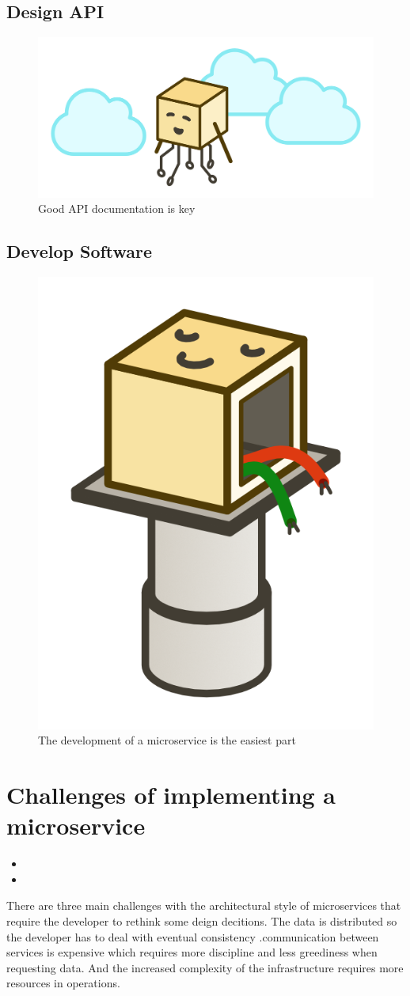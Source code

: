 \subsection{Design API}

\begin{figure}[ht]
  \centering
  \includegraphics[width=0.55\linewidth]{assets/illustration-microservice-api.png}
  \caption{Good API documentation is key}
\end{figure}

\subsection{Develop Software}

\begin{figure}[ht]
  \centering
  \includegraphics[width=0.2\linewidth]{assets/illustration-microservice-development.png}
  \caption{The development of a microservice is the easiest part}
\end{figure}


\section{Challenges of implementing a microservice}

\begin{itemize}
  \item {}
  \item {}
\end{itemize}

There are three main challenges with the architectural style of microservices that require the developer to rethink some deign decitions. The data is distributed so the developer has to deal with eventual consistency .communication between services is expensive which requires more discipline and less greediness when requesting data. And the increased complexity of the infrastructure requires more resources in operations.


